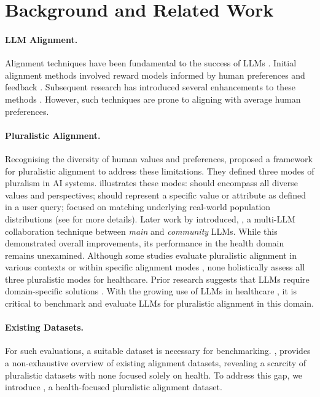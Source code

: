 \section{Background and Related Work}
\paragraph{LLM Alignment.} Alignment techniques have been fundamental to the success of LLMs \citep{wang2023aligning}. Initial alignment methods involved reward models informed by human preferences and feedback \citep{schulman2017proximal,christiano2017deep,stiennon2020learning}. Subsequent research has introduced several enhancements to these methods \citep{ouyang2022training,rafailov2024direct,xia-etal-2024-aligning}. However, such techniques are prone to aligning with average human preferences. 

\paragraph{Pluralistic Alignment.} Recognising the diversity of human values and preferences, \citet{positionpluralistic} proposed a framework for pluralistic alignment to address these limitations. They defined three modes of pluralism in AI systems.  illustrates these modes: \overton should encompass all diverse values and perspectives; \steerable should represent a specific value or attribute as defined in a user query; \distributional focused on matching underlying real-world population distributions (see  for more details). Later work by \citet{feng2024modular} introduced, \modplural, a multi-LLM collaboration technique between \textit{main} and \textit{community} LLMs. While this demonstrated overall improvements, its performance in the health domain remains unexamined. Although some studies evaluate pluralistic alignment in various contexts \citep{liu-etal-2024-evaluating-moral,benkler2023assessing,huang2024flames} or within specific alignment modes \citep{lake2024from,meister2024benchmarking}, none holistically assess all three pluralistic modes for healthcare. Prior research suggests that LLMs require domain-specific solutions \citep{zhao2023survey}. With the growing use of LLMs in healthcare \citep{yang_large_nodate,thirunavukarasu2023large}, it is critical to benchmark and evaluate LLMs for pluralistic alignment in this domain.



\paragraph{Existing Datasets.} For such evaluations, a suitable dataset is necessary for benchmarking. , provides a non-exhaustive overview of existing alignment datasets, revealing a scarcity of pluralistic datasets with none focused solely on health. To address this gap, we introduce \ourdataset, a health-focused pluralistic alignment  dataset.